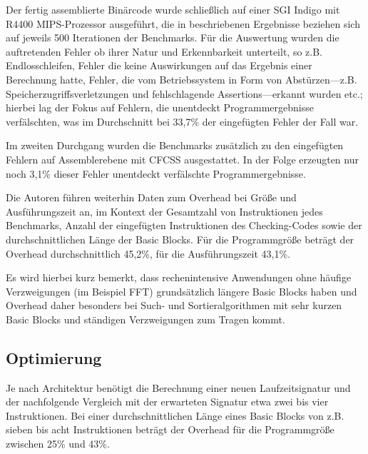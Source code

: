 \documentclass[11pt]{article}
\begin{document}
Der fertig assemblierte Binärcode wurde schließlich auf einer SGI Indigo mit
R4400 MIPS-Prozessor ausgeführt, die in \cite{oh-2002-control} beschriebenen
Ergebnisse beziehen sich auf jeweils 500 Iterationen der Benchmarks. Für die
Auswertung wurden die auftretenden Fehler ob ihrer Natur und Erkennbarkeit
unterteilt, so z.B. Endlosschleifen, Fehler die keine Auswirkungen auf das
Ergebnis einer Berechnung hatte, Fehler, die vom Betriebssystem in Form von
Abstürzen—z.B. Speicherzugriffsverletzungen und fehlschlagende
Assertions—erkannt wurden etc.; hierbei lag der Fokus auf Fehlern, die
unentdeckt Programmergebnisse verfälschten, was im Durchschnitt bei 33,7\% der
eingefügten Fehler der Fall war.

Im zweiten Durchgang wurden die Benchmarks zusätzlich zu den eingefügten
Fehlern auf Assemblerebene mit CFCSS ausgestattet. In der Folge erzeugten nur
noch 3,1\% dieser Fehler unentdeckt verfälschte Programmergebnisse.

Die Autoren führen weiterhin Daten zum Overhead bei Größe und Ausführungszeit
an, im Kontext der Gesamtzahl von Instruktionen jedes Benchmarks, Anzahl der
eingefügten Instruktionen des Checking-Codes sowie der durchschnittlichen Länge
der Basic Blocks. Für die Programmgröße beträgt der Overhead durchschnittlich
45,2\%, für die Ausführungszeit 43,1\%.

Es wird hierbei kurz bemerkt, dass rechenintensive Anwendungen ohne häufige
Verzweigungen (im Beispiel FFT) grundsätzlich längere Basic Blocks haben und
Overhead daher besonders bei Such- und Sortieralgorithmen mit sehr kurzen Basic
Blocks und ständigen Verzweigungen zum Tragen kommt.


\subsection{Optimierung}

Je nach Architektur benötigt die Berechnung einer neuen Laufzeitsignatur und
der nachfolgende Vergleich mit der erwarteten Signatur etwa zwei bis vier
Instruktionen. Bei einer durchschnittlichen Länge eines Basic Blocks von z.B.
sieben bis acht Instruktionen beträgt der Overhead für die Programmgröße
zwischen 25\% und 43\%. %
\end{document}
